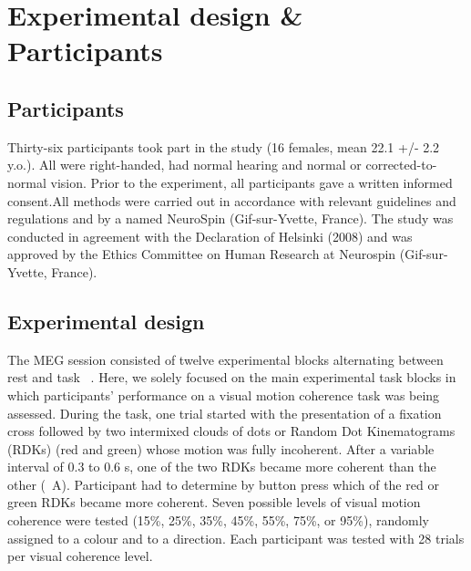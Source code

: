 \section{Experimental design \& Participants}
\subsection*{Participants}
Thirty-six participants took part in the study (16 females, mean 22.1 +/- 2.2 y.o.). All were right-handed, had normal hearing and normal or corrected-to-normal vision. Prior to the experiment, all participants gave a written informed consent.All methods were carried out in accordance with relevant guidelines and regulations and by a named NeuroSpin (Gif-sur-Yvette, France). The study was conducted in agreement with the Declaration of Helsinki (2008) and was approved by the Ethics Committee on Human Research at Neurospin (Gif-sur-Yvette, France). 

\subsection*{Experimental design}
The MEG session consisted of twelve experimental blocks alternating between rest and task ~\cite{23zilber2014supramodal}. Here, we solely focused on the main experimental task blocks in which participants' performance on a visual motion coherence task was being assessed. During the task, one trial started with the presentation of a fixation cross followed by two intermixed clouds of dots or Random Dot Kinematograms (RDKs) (red and green) whose motion was fully incoherent. After a variable interval of 0.3 to 0.6 s, one of the two RDKs became more coherent than the other (~A). Participant had to determine by button press which of the red or green RDKs became more coherent. Seven possible levels of visual motion coherence were tested (15\%, 25\%, 35\%, 45\%, 55\%, 75\%, or 95\%), randomly assigned to a colour and to a direction. Each participant was tested with 28 trials per visual coherence level.

